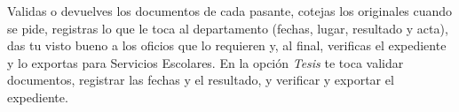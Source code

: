 \documentclass[11pt,a4paper]{article}
\begin{document}
{\small\tableofcontents}
\newpage
\begin{quevasahacer}
Validas o devuelves los documentos de cada pasante, cotejas los originales cuando se pide, registras lo que le toca al departamento (fechas, lugar, resultado y acta), das tu visto bueno a los oficios que lo requieren y, al final, verificas el expediente y lo exportas para Servicios Escolares. En la opción \emph{Tesis} te toca validar documentos, registrar las fechas y el resultado, y verificar y exportar el expediente.
\end{quevasahacer}



\end{document}
